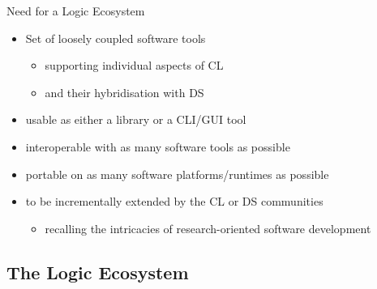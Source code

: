 \documentclass[presentation]{beamer}\mode<presentation>{\usetheme{AMSBolognaFC}}
\begin{document}
\begin{frame}{Need for a Logic Ecosystem}
    \begin{itemize}
        \item Set of loosely coupled software tools
        \begin{itemize}
            \item supporting individual aspects of CL
            \item and their hybridisation with DS
        \end{itemize}

        \vfill

        \item usable as either a library or a CLI/GUI tool
        
        \vfill

        \item interoperable with as many software tools as possible
        
        \vfill

        \item portable on as many software platforms/runtimes as possible
        
        \vfill

        \item to be incrementally extended by the CL or DS communities
        \begin{itemize}
            \item recalling the intricacies of research-oriented software development
        \end{itemize}
    \end{itemize}
\end{frame}

\subsection{The \twopkt{} Logic Ecosystem}
\end{document}
